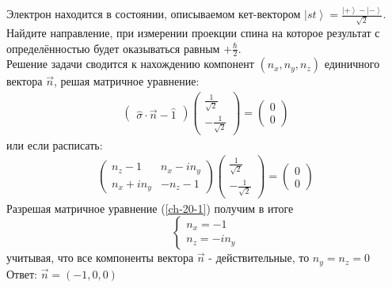 \documentclass[__main__.tex]{subfiles}
\begin{document}
	
	Электрон находится в состоянии, описываемом кет-вектором $\left|st\right>=\frac{\left|+\right>-\left|-\right>}{\sqrt{2}}$. Найдите направление, при измерении проекции спина на которое результат с определённостью будет оказываться равным $+\frac{\hbar}{2}$.\\
	
	Решение задачи сводится к нахождению компонент $(n_x,n_y,n_z)$ единичного вектора $\vec{n}$, решая матричное уравнение:
	\begin{gather*}
		\begin{pmatrix}\hat{\sigma}\cdot\vec{n}-\hat{1}\end{pmatrix}\begin{pmatrix}\frac{1}{\sqrt{2}}\\ -\frac{1}{\sqrt{2}}\end{pmatrix} = \begin{pmatrix}0\\0\end{pmatrix}
	\end{gather*}
	или если расписать:
	\begin{gather}
		\label{ch-20-1}
		\begin{pmatrix}
			n_z-1 & n_x-in_y\\
			n_x+in_y & -n_z-1
		\end{pmatrix}\begin{pmatrix}\frac{1}{\sqrt{2}}\\ -\frac{1}{\sqrt{2}}\end{pmatrix} = \begin{pmatrix}0\\0\end{pmatrix}
	\end{gather}
	Разрешая матричное уравнение (\ref{ch-20-1}) получим в итоге
	\begin{equation*}
		\begin{cases}
			n_x = -1\\
			n_z = -in_y	
		\end{cases}
	\end{equation*}
	учитывая, что все компоненты вектора $\vec{n}$ - действительные, то $n_y = n_z = 0$\\
	Ответ: $\vec{n} = (-1,0,0)$ 
\end{document}
